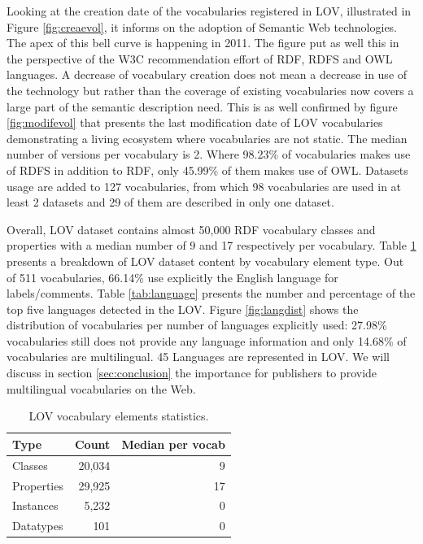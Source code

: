 \documentclass{iosart2c}
\begin{document}
Looking at the creation date of the vocabularies registered in LOV, illustrated in Figure \ref{fig:creaevol}, it informs on the adoption of Semantic Web technologies. The apex of this bell curve is happening in 2011. The figure put as well this in the perspective of the W3C recommendation effort of RDF, RDFS and OWL languages. A decrease of vocabulary creation does not mean a decrease in use of the technology but rather than the coverage of existing vocabularies now covers a large part of the semantic description need. This is as well confirmed by figure \ref{fig:modifevol} that presents the last modification date of LOV vocabularies demonstrating a living ecosystem where vocabularies are not static. The median number of versions per vocabulary is 2. Where 98.23\% of vocabularies makes use of RDFS in addition to RDF, only 45.99\% of them makes use of OWL. Datasets usage are added to 127 vocabularies, from which 98 vocabularies are used in at least 2 datasets and 29 of them are described in only one dataset. 

Overall, LOV dataset contains almost 50,000 RDF vocabulary classes and properties with a median number of 9 and 17 respectively per vocabulary. Table \ref{tab:elements} presents a breakdown of LOV dataset content by vocabulary element type. Out of 511 vocabularies, 66.14\% use explicitly the English language for labels/comments. Table \ref{tab:language} presents the number and percentage of the top five languages detected in the LOV. Figure \ref{fig:langdist} shows the distribution of vocabularies per number of languages explicitly used: 27.98\% vocabularies still does not provide any language information and only 14.68\% of vocabularies are multilingual. 45 Languages are represented in LOV. We will discuss in section \ref{sec:conclusion} the importance for publishers to provide multilingual vocabularies on the Web.

\begin{table}[h!tb]
\caption{LOV vocabulary elements statistics.}
\begin{tabular}{lrr}
\hline
\textbf{Type} & \textbf{Count} &  \textbf{Median per vocab} \\ \hline
Classes & 20,034 & 9 \\
Properties & 29,925 & 17 \\
Instances & 5,232 & 0 \\
Datatypes & 101 & 0 \\
\hline  
\end{tabular}
\label{tab:elements}
\end{table}
\end{document}
